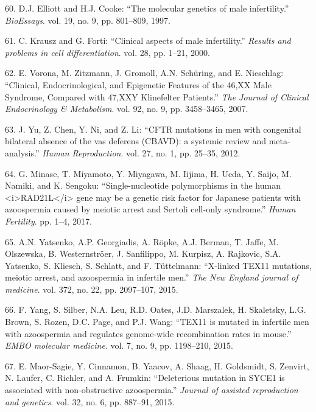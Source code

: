 \documentclass[12pt,a4paper,twoside]{ugathesis}
\theoremstyle{definition}
\theoremstyle{definition}
\theoremstyle{definition}
\theoremstyle{remark}
\begin{document}
\hypertarget{ref-Elliott1997}{}
60. D.J. Elliott and H.J. Cooke: ``The molecular genetics of male
infertility.'' \emph{BioEssays}. vol. 19, no. 9, pp. 801--809, 1997.

\hypertarget{ref-Krausz2000}{}
61. C. Krausz and G. Forti: ``Clinical aspects of male infertility.''
\emph{Results and problems in cell differentiation}. vol. 28, pp. 1--21,
2000.

\hypertarget{ref-Vorona2007}{}
62. E. Vorona, M. Zitzmann, J. Gromoll, A.N. Schüring, and E. Nieschlag:
``Clinical, Endocrinological, and Epigenetic Features of the 46,XX Male
Syndrome, Compared with 47,XXY Klinefelter Patients.'' \emph{The Journal
of Clinical Endocrinology \& Metabolism}. vol. 92, no. 9, pp.
3458--3465, 2007.

\hypertarget{ref-Yu2012}{}
63. J. Yu, Z. Chen, Y. Ni, and Z. Li: ``CFTR mutations in men with
congenital bilateral absence of the vas deferens (CBAVD): a systemic
review and meta-analysis.'' \emph{Human Reproduction}. vol. 27, no. 1,
pp. 25--35, 2012.

\hypertarget{ref-Minase2017}{}
64. G. Minase, T. Miyamoto, Y. Miyagawa, M. Iijima, H. Ueda, Y. Saijo,
M. Namiki, and K. Sengoku: ``Single-nucleotide polymorphisms in the
human \textless{}i\textgreater{}RAD21L\textless{}/i\textgreater{} gene
may be a genetic risk factor for Japanese patients with azoospermia
caused by meiotic arrest and Sertoli cell-only syndrome.'' \emph{Human
Fertility}. pp. 1--4, 2017.

\hypertarget{ref-Yatsenko2015}{}
65. A.N. Yatsenko, A.P. Georgiadis, A. Röpke, A.J. Berman, T. Jaffe, M.
Olszewska, B. Westernströer, J. Sanfilippo, M. Kurpisz, A. Rajkovic,
S.A. Yatsenko, S. Kliesch, S. Schlatt, and F. Tüttelmann: ``X-linked
TEX11 mutations, meiotic arrest, and azoospermia in infertile men.''
\emph{The New England journal of medicine}. vol. 372, no. 22, pp.
2097--107, 2015.

\hypertarget{ref-Yang2015}{}
66. F. Yang, S. Silber, N.A. Leu, R.D. Oates, J.D. Marszalek, H.
Skaletsky, L.G. Brown, S. Rozen, D.C. Page, and P.J. Wang: ``TEX11 is
mutated in infertile men with azoospermia and regulates genome-wide
recombination rates in mouse.'' \emph{EMBO molecular medicine}. vol. 7,
no. 9, pp. 1198--210, 2015.

\hypertarget{ref-Maor-Sagie2015}{}
67. E. Maor-Sagie, Y. Cinnamon, B. Yaacov, A. Shaag, H. Goldsmidt, S.
Zenvirt, N. Laufer, C. Richler, and A. Frumkin: ``Deleterious mutation
in SYCE1 is associated with non-obstructive azoospermia.'' \emph{Journal
of assisted reproduction and genetics}. vol. 32, no. 6, pp. 887--91,
2015.
\end{document}

